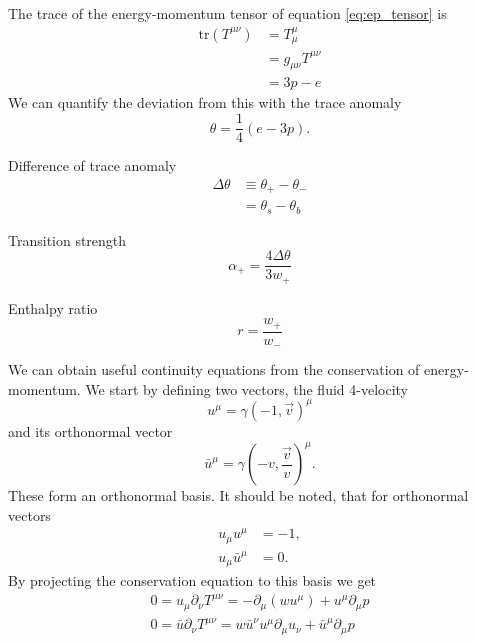 The trace of the energy-momentum tensor of equation \ref{eq:ep_tensor} is
\begin{align}
\text{tr} (T^{\mu \nu})
&= T^\mu_\mu \\
&= g_{\mu \nu} T^{\mu \nu} \\
&=3p - e
\end{align}
We can quantify the deviation from this with the trace anomaly
\cites[eq. 7.24]{lecture_notes}[eq. 28]{giese_2020}
\begin{equation}
\theta = \frac{1}{4}(e-3p).
\end{equation}

Difference of trace anomaly
\begin{align}
\Delta \theta
&\equiv \theta_+ - \theta_- \\
&= \theta_s - \theta_b
\end{align}

Transition strength
\begin{equation}
\alpha_+ = \frac{4 \Delta \theta}{3 w_+}
\end{equation}

Enthalpy ratio
\begin{equation}
r = \frac{w_+}{w_-}
\end{equation}

We can obtain useful continuity equations from the conservation of energy-momentum.
We start by defining two vectors, the fluid 4-velocity
\begin{equation}
u^\mu = \gamma(-1, \overrightarrow{v})^\mu
\end{equation}
and its orthonormal vector
\begin{equation}
\bar{u}^\mu = \gamma(-v, \frac{\overrightarrow{v}}{v})^\mu.
\end{equation}
These form an orthonormal basis.
It should be noted, that for orthonormal vectors
\begin{align}
u_\mu u^\mu &= -1, \\
u_\mu \bar{u}^\mu &= 0.
\end{align}
By projecting the conservation equation to this basis we get
\begin{align}
0 = u_\mu \partial_\nu T^{\mu \nu} = -\partial_\mu (w u^\mu) + u^\mu \partial_\mu p \\
0 = \bar{u} \partial_\nu T^{\mu \nu} = w \bar{u}^\nu u^\mu \partial_\mu u_\nu + \bar{u}^\mu \partial_\mu p
\end{align}

